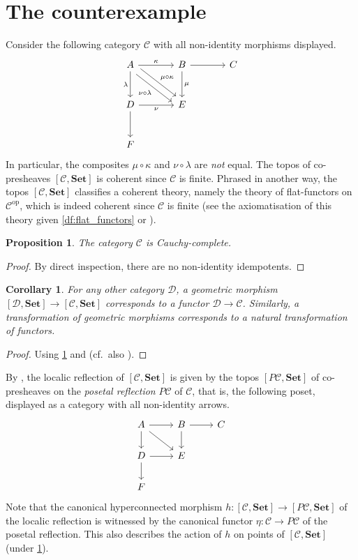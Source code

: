 \documentclass{article}
\theoremstyle{plain}
\newtheorem{coro}[thm]{Corollary}
\newtheorem{prop}[thm]{Proposition}
\theoremstyle{definition}
\newcommand{\cat}{\mathcal{C}}
\newcommand{\dcat}{\mathcal{D}}
\newcommand{\Set}{\mathbf{Set}}
\newcommand{\op}{^{\mathrm{op}}}
\begin{document}
	\section{The counterexample}
	Consider the following category $\cat$ with all non-identity morphisms displayed.
	\[
	\begin{tikzcd}[sep = large]
		{A } & B & C \\
		D & E \\
		F
		\arrow["\kappa", from=1-1, to=1-2]
		\arrow["\lambda"', from=1-1, to=2-1]
		\arrow["{\mu \circ \kappa}", shift left = 1.5, from=1-1, to=2-2]
		\arrow["{\nu \circ \lambda}"', shift right = 1.5, from=1-1, to=2-2]
		\arrow[from=1-2, to=1-3]
		\arrow["\mu", from=1-2, to=2-2]
		\arrow["\nu"', from=2-1, to=2-2]
		\arrow[from=2-1, to=3-1]
	\end{tikzcd}
	\]
	In particular, the composites $\mu \circ \kappa$ and $\nu \circ \lambda$ are \emph{not} equal.  The topos of co-presheaves $[\cat,\Set]$ is coherent since $\cat$ is finite.  Phrased in another way, the topos $[\cat,\Set]$ classifies a coherent theory, namely the theory of flat-functors on $\cat\op$, which is indeed coherent since $\cat$ is finite (see the axiomatisation of this theory given \cref{df:flat_functors} or \cite[Theorem 2.1.11]{TST}).
	
	\begin{prop}\label{prop:C_is_cauchy_complete}
		The category $\cat$ is Cauchy-complete.
	\end{prop}
	\begin{proof}
		By direct inspection, there are no non-identity idempotents.
	\end{proof}
	\begin{coro}\label{coro:geom_morphs_are_functors}
		For any other category $\dcat$, a geometric morphism $[\dcat,\Set] \to [\cat,\Set]$ corresponds to a functor $\dcat \to \cat$.  Similarly, a transformation of geometric morphisms corresponds to a natural transformation of functors.
	\end{coro}
	\begin{proof}
		Using \cref{prop:C_is_cauchy_complete} and \cite[Expos\'e VI, Exercice 3.12]{SGA} (cf.\ also \cite[Lemma A4.1.5]{elephant}).
	\end{proof}
	By \cite[Example C2.3.20]{elephant}, the localic reflection of $[\cat,\Set]$ is given by the topos $[P\cat,\Set]$ of co-presheaves on the \emph{posetal reflection} $P\cat$ of $\cat$, that is, the following poset, displayed as a category with all non-identity arrows.
	\[\begin{tikzcd}
		{A } & B & C \\
		D & E \\
		F
		\arrow[from=1-1, to=1-2]
		\arrow[from=1-1, to=2-1]
		\arrow[from=1-1, to=2-2]
		\arrow[from=1-2, to=1-3]
		\arrow[from=1-2, to=2-2]
		\arrow[from=2-1, to=2-2]
		\arrow[from=2-1, to=3-1]
	\end{tikzcd}\]
	Note that the canonical hyperconnected morphism $h \colon [\cat,\Set] \to [P\cat,\Set]$ of the localic reflection is witnessed by the canonical functor $\eta \colon \cat \to P\cat$ of the posetal reflection.  This also describes the action of $h$ on points of $[\cat,\Set]$ (under \cref{coro:geom_morphs_are_functors}).
	
\end{document}
